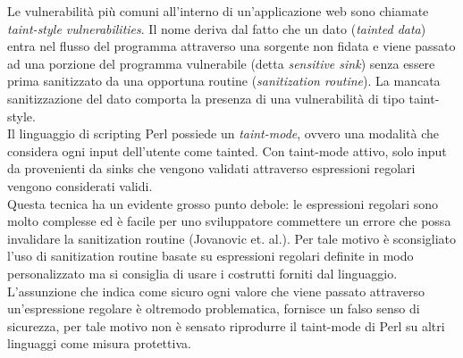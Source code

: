 Le vulnerabilità più comuni all'interno di un'applicazione web sono chiamate \emph{taint-style vulnerabilities}. Il nome deriva dal fatto che un dato (\emph{tainted data}) entra nel flusso del programma attraverso una sorgente non fidata e viene passato ad una porzione del programma vulnerabile (detta \emph{sensitive sink}) senza essere prima sanitizzato da una opportuna routine (\emph{sanitization routine}). La mancata sanitizzazione del dato comporta la presenza di una vulnerabilità di tipo taint-style.\\
Il linguaggio di scripting Perl possiede un \emph{taint-mode}, ovvero una modalità che considera ogni input dell'utente come tainted. Con taint-mode attivo, solo input da provenienti da sinks che vengono validati attraverso espressioni regolari vengono considerati validi.\\
Questa tecnica ha un evidente grosso punto debole: le espressioni regolari sono molto complesse ed è facile per uno sviluppatore commettere un errore che possa invalidare la sanitization routine (Jovanovic et. al.\cite{pixy}). Per tale motivo è sconsigliato l'uso di sanitization routine basate su espressioni regolari definite in modo personalizzato ma si consiglia di usare i costrutti forniti dal linguaggio. L'assunzione che indica come sicuro ogni valore che viene passato attraverso un'espressione regolare è oltremodo problematica, fornisce un falso senso di sicurezza, per tale motivo non è sensato riprodurre il taint-mode di Perl su altri linguaggi come misura protettiva.

